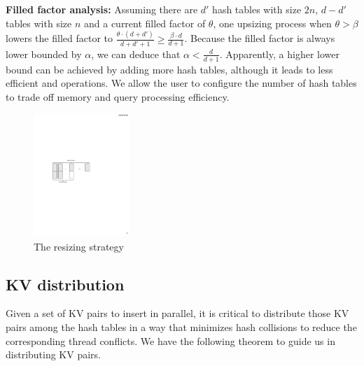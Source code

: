 \vspace{1mm}
\noindent\textbf{Filled factor analysis:}
Assuming there are $d'$ hash tables with size $2n$, $d-d'$ tables with size $n$ and a current filled factor of $\theta$, 
one upsizing process when $\theta > \beta$ lowers the filled factor to $\frac{\theta\cdot(d+d')}{d+d'+1} \geq \frac{\beta \cdot d}{d+1}$.  
Because the filled factor is always lower bounded by $\alpha$, we can deduce that $\alpha < \frac{d}{d+1}$.
Apparently, a higher lower bound can be achieved by adding more hash tables, although it leads to less efficient  and  operations. 
We allow the user to configure the number of hash tables to trade off memory and query processing efficiency. 

\begin{figure}[t]
	\centering
	\includegraphics[width=0.32\textwidth]{fig/MultiTable.pdf}
	\caption{The resizing strategy}
	\label{fig:example-resize}
\end{figure}
\subsection{KV distribution}\label{sec:dyn:distribute}
Given a set of KV pairs to insert in parallel, it is critical to distribute those KV pairs among the hash tables in a way that minimizes hash collisions to reduce the corresponding thread conflicts. We have the following theorem to guide us in distributing KV pairs. 

